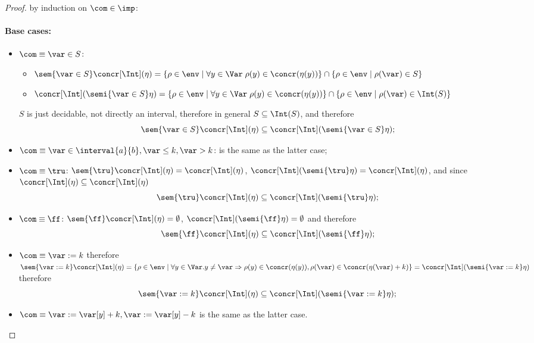 \begin{proof}
  by induction on \(\com\in\imp\):
  
  \noindent
  \paragraph*{Base cases:\\}
  \begin{itemize}
  \item \(\com \equiv \var \in S\):
    \begin{itemize}
    \item \(\sem{\var\in S}\concr[\Int](\eta) = \{\rho \in \env \mid
      \forall y \in \Var \; \rho(y) \in \concr(\eta(y))\} \cap \{\rho
      \in \env \mid \rho(\var) \in S\}\)
    \item \(\concr[\Int](\semi{\var\in S}\eta) = \{\rho \in \env \mid
      \forall y \in \Var \; \rho(y) \in \concr(\eta(y))\} \cap \{\rho
      \in \env \mid \rho(\var) \in \Int(S)\}\)
    \end{itemize}
    \(S\) is just decidable, not directly an interval, therefore in
    general \(S \subseteq \Int(S)\), and therefore \[\sem{\var \in
      S}\concr[\Int](\eta) \subseteq \concr[\Int](\semi{\var\in
      S}\eta);\]
  \item \(\com \equiv \var \in \interval{a}{b}, \var \leq k, \var >
    k\): is the same as the latter case;
  \item \(\com \equiv \tru\): \(\sem{\tru}\concr[\Int](\eta) =
    \concr[\Int](\eta)\), \(\concr[\Int](\semi{\tru}\eta) =
    \concr[\Int](\eta)\), and since \(\concr[\Int](\eta) \subseteq
    \concr[\Int](\eta)\) \[\sem{\tru}\concr[\Int](\eta) \subseteq
    \concr[\Int](\semi{\tru}\eta);\]
  \item \(\com \equiv \ff\): \(\sem{\ff}\concr[\Int](\eta) =
    \emptyset\), \(\concr[\Int](\semi{\ff}\eta) = \emptyset\) and
    therefore \[\sem{\ff}\concr[\Int](\eta) \subseteq
    \concr[\Int](\semi{\ff}\eta);\]
  \item \(\com \equiv \var := k\) therefore \(\sem{\var := k}
    \concr[\Int](\eta) = \{\rho \in \env \mid \forall y\in \Var . y
    \neq \var \Rightarrow \rho(y) \in \concr(\eta(y)), \rho(\var) \in
    \concr(\eta(\var) + k)\} = \concr[\Int](\semi{\var := k}\eta)\)
    therefore \[\sem{\var := k} \concr[\Int](\eta) \subseteq
    \concr[\Int](\semi{\var := k}\eta);\]
  \item \(\com \equiv \var := \var[y] + k, \var := \var[y] - k\) is
    the same as the latter case.
  \end{itemize}  
  \noindent

\end{proof}
